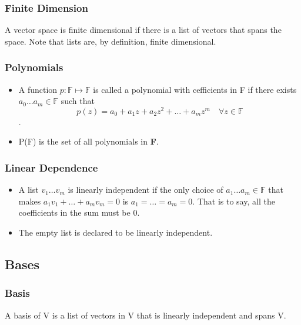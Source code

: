 \documentclass{article}
\begin{document}
\subsubsection{Finite Dimension}
A vector space is finite dimensional if there is a list of vectors that spans the space. Note that lists are, by definition, finite dimensional.


\subsubsection{Polynomials}

\begin{itemize}

\item A function \( p : \mathbb{F} \mapsto \mathbb{F} \) is called a polynomial with cefficients in F if there exists \(  a_{0} \ldots a_{m} \in \mathbb{F} \) such that \[   p(z) = a_{0} + a_{1} z + a_{2}z^{2} + \ldots + a_{m} z^{m} \quad \forall z \in \mathbb{F}   \] .

\item P(F) is the set of all polynomials in \textbf{F}.

\end{itemize}


\subsubsection{Linear Dependence}
\begin{itemize}

\item A list \(v_{1} \ldots v_{m}   \) is linearly independent if the only choice of \( a_{1} \ldots a_{m} \in \mathbb{F}  \) that makes \(  a_{1}v_{1} + \ldots + a_{m}v_{m} =0   \) is \(  a_{1} = \ldots = a_{m} = 0   \). That is to say, all the coefficients in the sum must be 0.


\item The empty list is declared to be linearly independent.

\end{itemize}


\subsection{Bases}

\subsubsection{Basis}
A basis of V is a list of vectors in V that is linearly independent and spans V.
\end{document}
